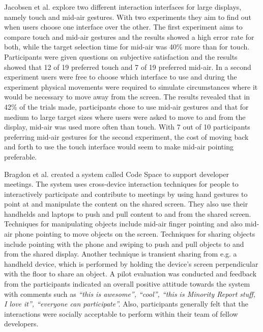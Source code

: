 Jacobsen et al. \cite{Jakobsen:2015} explore two different interaction interfaces for large displays, namely touch and mid-air gestures.
With two experiments they aim to find out when users choose one interface over the other.
The first experiment aims to compare touch and mid-air gestures and the results showed a high error rate for both, while the target selection time for mid-air was 40\% more than for touch.
Participants were given questions on subjective satisfaction and the results showed that 12 of 19 preferred touch and 7 of 19 preferred mid-air.
In a second experiment users were free to choose which interface to use and during the experiment physical movements were required to simulate circumstances where it would be necessary to move away from the screen.
The results revealed that in 42\% of the trials made, participants chose to use mid-air gestures and that for medium to large target sizes where users were asked to move to and from the display, mid-air was used more often than touch.
With 7 out of 10 participants preferring mid-air gestures for the second experiment, the cost of moving back and forth to use the touch interface would seem to make mid-air pointing preferable.

Bragdon et al. \cite{Bragdon:2011} created a system called Code Space to support developer meetings.
The system uses cross-device interaction techniques for people to interactively participate and contribute to meetings by using hand gestures to point at and manipulate the content on the shared screen.
They also use their handhelds and laptops to push and pull content to and from the shared screen.
Techniques for manipulating objects include mid-air finger pointing and also mid-air phone pointing to move objects on the screen.
Techniques for sharing objects include pointing with the phone and swiping to push and pull objects to and from the shared display.
Another technique is transient sharing from e.g. a handheld device, which is performed by holding the device's screen perpendicular with the floor to share an object.
A pilot evaluation was conducted and feedback from the participants indicated an overall positive attitude towards the system with comments such as \textit{``this is awesome'', ``cool'', ``this is Minority Report stuff, I love it'', ``everyone can participate''.}
Also, participants generally felt that the interactions were socially acceptable to perform within their team of fellow developers.

